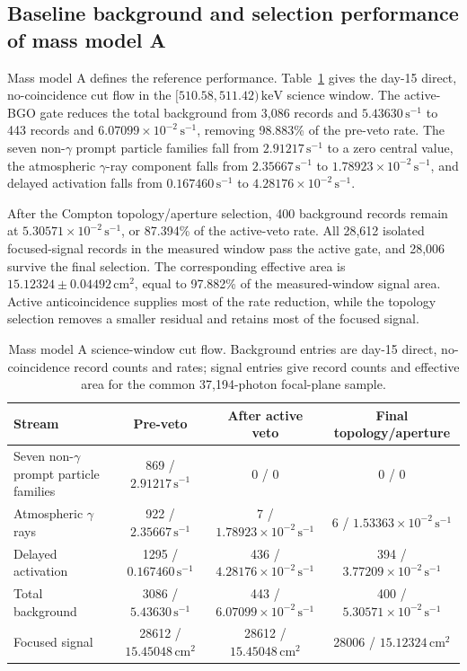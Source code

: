 \documentclass[11pt]{article}
\newcommand{\revblue}[1]{\textcolor{revisionblue}{#1}}
\newcommand{\keV}{\ensuremath{\,\mathrm{keV}}}
\newcommand{\cps}{\ensuremath{\,\mathrm{s^{-1}}}}
\begin{document}
\subsection{Baseline background and selection performance of mass model A}
\label{subsec:model_a_baseline}
\label{subsec:reference_background_results}

Mass model A defines the reference performance. Table~\ref{tab:phase2_cutflow} gives the day-15 direct, no-coincidence cut flow in the $[510.58,511.42)\keV$ science window. The active-BGO gate reduces the total background from 3,086 records and $5.43630\cps$ to 443 records and $6.07099\times10^{-2}\cps$, removing 98.883\% of the pre-veto rate. The \revblue{seven non-$\gamma$ prompt particle families} fall from $2.91217\cps$ to a zero central value, the \revblue{atmospheric $\gamma$-ray component} falls from $2.35667\cps$ to $1.78923\times10^{-2}\cps$, and delayed activation falls from $0.167460\cps$ to $4.28176\times10^{-2}\cps$.

After the Compton topology/aperture selection, 400 background records remain at $5.30571\times10^{-2}\cps$, or 87.394\% of the active-veto rate. All 28,612 isolated focused-signal records in the measured window pass the active gate, and 28,006 survive the final selection. The corresponding effective area is $15.12324\pm0.04492\,\mathrm{cm^2}$, equal to 97.882\% of the measured-window signal area. Active anticoincidence supplies most of the rate reduction, while the topology selection removes a smaller residual and retains most of the focused signal.

\begin{table}[H]
\centering
\caption{Mass model A science-window cut flow. Background entries are day-15 direct, no-coincidence record counts and rates; signal entries give record counts and effective area for the common 37,194-photon focal-plane sample.}
\label{tab:phase2_cutflow}
\footnotesize
\begin{tabular}{lccc}
\toprule
Stream & Pre-veto & After active veto & Final topology/aperture \\
\midrule
\revblue{Seven non-$\gamma$ prompt particle families} & 869 / $2.91217\cps$ & 0 / 0 & 0 / 0 \\
\revblue{Atmospheric $\gamma$ rays} & 922 / $2.35667\cps$ & 7 / $1.78923\times10^{-2}\cps$ & 6 / $1.53363\times10^{-2}\cps$ \\
Delayed activation & 1295 / $0.167460\cps$ & 436 / $4.28176\times10^{-2}\cps$ & 394 / $3.77209\times10^{-2}\cps$ \\
Total background & 3086 / $5.43630\cps$ & 443 / $6.07099\times10^{-2}\cps$ & 400 / $5.30571\times10^{-2}\cps$ \\
Focused signal & 28612 / $15.45048\,\mathrm{cm^2}$ & 28612 / $15.45048\,\mathrm{cm^2}$ & 28006 / $15.12324\,\mathrm{cm^2}$ \\
\bottomrule
\end{tabular}
\end{table}
\end{document}
